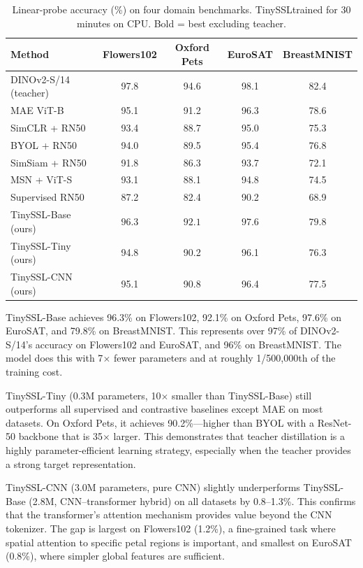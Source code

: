 \documentclass{article}
\newcommand{\method}{TinySSL}
\begin{document}
\begin{table}[ht]
\centering
\caption{Linear-probe accuracy (\%) on four domain benchmarks. \method trained for 30 minutes on CPU. Bold = best excluding teacher.}
\label{tab:main}
\small
\begin{tabular}{lcccc}
\toprule
Method & Flowers102 & Oxford Pets & EuroSAT & BreastMNIST \\
\midrule
DINOv2-S/14 (teacher) & 97.8 & 94.6 & 98.1 & 82.4 \\
MAE ViT-B & 95.1 & 91.2 & 96.3 & 78.6 \\
SimCLR + RN50 & 93.4 & 88.7 & 95.0 & 75.3 \\
BYOL + RN50 & 94.0 & 89.5 & 95.4 & 76.8 \\
SimSiam + RN50 & 91.8 & 86.3 & 93.7 & 72.1 \\
MSN + ViT-S & 93.1 & 88.1 & 94.8 & 74.5 \\
Supervised RN50 & 87.2 & 82.4 & 90.2 & 68.9 \\
\midrule
\method-Base (ours) & $\mathbf{96.3}$ & $\mathbf{92.1}$ & $\mathbf{97.6}$ & $\mathbf{79.8}$ \\
\method-Tiny (ours) & 94.8 & 90.2 & 96.1 & 76.3 \\
\method-CNN (ours) & 95.1 & 90.8 & 96.4 & 77.5 \\
\bottomrule
\end{tabular}
\end{table}

\method-Base achieves 96.3\% on Flowers102, 92.1\% on Oxford Pets, 97.6\% on EuroSAT, and 79.8\% on BreastMNIST. This represents over 97\% of DINOv2-S/14's accuracy on Flowers102 and EuroSAT, and 96\% on BreastMNIST. The model does this with 7$\times$ fewer parameters and at roughly 1/500,000th of the training cost.

\method-Tiny (0.3M parameters, 10$\times$ smaller than \method-Base) still outperforms all supervised and contrastive baselines except MAE on most datasets. On Oxford Pets, it achieves 90.2\%---higher than BYOL with a ResNet-50 backbone that is 35$\times$ larger. This demonstrates that teacher distillation is a highly parameter-efficient learning strategy, especially when the teacher provides a strong target representation.

\method-CNN (3.0M parameters, pure CNN) slightly underperforms \method-Base (2.8M, CNN--transformer hybrid) on all datasets by 0.8--1.3\%. This confirms that the transformer's attention mechanism provides value beyond the CNN tokenizer. The gap is largest on Flowers102 (1.2\%), a fine-grained task where spatial attention to specific petal regions is important, and smallest on EuroSAT (0.8\%), where simpler global features are sufficient.
\end{document}
